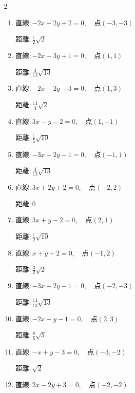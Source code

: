 \begin{multicols}{2}
\begin{enumerate}
        $\displaystyle 距離 : \frac{4}{5}\sqrt{5}$

  \item $直線:-2x+2y+2=0,\quad 点 ( -3, -3 )$

        $\displaystyle 距離 : \frac{1}{2}\sqrt{2}$

  \item $直線:-2x-3y+1=0,\quad 点 ( 1, 1 )$

        $\displaystyle 距離 : \frac{4}{13}\sqrt{13}$

  \item $直線:-2x-2y-3=0,\quad 点 ( 1, 3 )$

        $\displaystyle 距離 : \frac{11}{4}\sqrt{2}$

  \item $直線:3x-y-2=0,\quad 点 ( 1, -1 )$

        $\displaystyle 距離 : \frac{1}{5}\sqrt{10}$

  \item $直線:-3x+2y-1=0,\quad 点 ( -1, 1 )$

        $\displaystyle 距離 : \frac{4}{13}\sqrt{13}$

  \item $直線:3x+2y+2=0,\quad 点 ( -2, 2 )$

        $\displaystyle 距離 : 0$

  \item $直線:3x+y-2=0,\quad 点 ( 2, 1 )$

        $\displaystyle 距離 : \frac{1}{2}\sqrt{10}$

  \item $直線:x+y+2=0,\quad 点 ( -1, 2 )$

        $\displaystyle 距離 : \frac{3}{2}\sqrt{2}$

\columnbreak %

  \item $直線:-3x-2y-1=0,\quad 点 ( -2, -3 )$

        $\displaystyle 距離 : \frac{11}{13}\sqrt{13}$

  \item $直線:-2x-y-1=0,\quad 点 ( 2, 3 )$

        $\displaystyle 距離 : \frac{8}{5}\sqrt{5}$

  \item $直線:-x+y-3=0,\quad 点 ( -3, -2 )$

        $\displaystyle 距離 : \sqrt{2}$

  \item $直線:2x-2y+3=0,\quad 点 ( -2, -2 )$


\end{enumerate}
\end{multicols}
